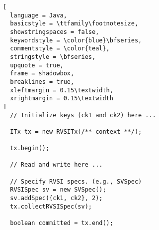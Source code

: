 \begin{lstlisting}[
  language = Java,
  basicstyle = \ttfamily\footnotesize,
  showstringspaces = false,
  keywordstyle = \color{blue}\bfseries,
  commentstyle = \color{teal},
  stringstyle = \bfseries,
  upquote = true,
  frame = shadowbox,
  breaklines = true,
  xleftmargin = 0.15\textwidth,
  xrightmargin = 0.15\textwidth
]
  // Initialize keys (ck1 and ck2) here ...

  ITx tx = new RVSITx(/** context **/);

  tx.begin();

  // Read and write here ...

  // Specify RVSI specs. (e.g., SVSpec)
  RVSISpec sv = new SVSpec();
  sv.addSpec({ck1, ck2}, 2);
  tx.collectRVSISpec(sv);

  boolean committed = tx.end();
\end{lstlisting}
